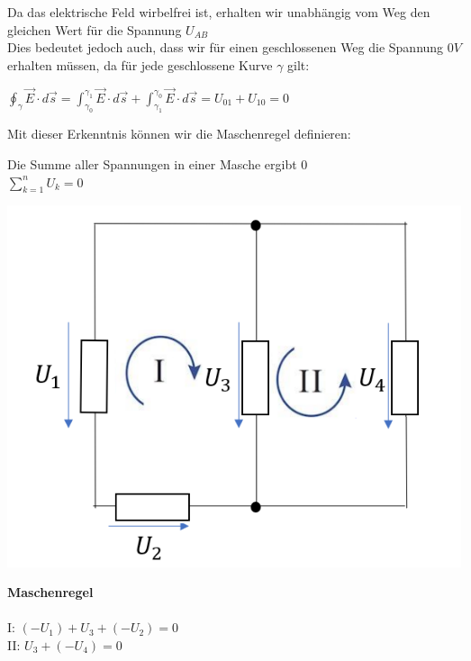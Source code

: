 										Da das elektrische Feld wirbelfrei ist, erhalten wir unabhängig vom Weg den gleichen Wert für die Spannung $ U_{AB} $ \\
										Dies bedeutet jedoch auch, dass wir für einen geschlossenen Weg die Spannung $0V$ erhalten müssen, da für jede geschlossene Kurve $\gamma$ gilt:
										\begin{center}
											\vspace{-2mm}

											$\displaystyle \oint_{\gamma} \vec{E} \cdot d\vec{s} = \int_{\gamma_0}^{\gamma_1} \vec{E} \cdot d\vec{s} + \int_{\gamma_1}^{\gamma_0} \vec{E} \cdot d\vec{s} = U_{01} + U_{10} = 0$
										\end{center}
										Mit dieser Erkenntnis können wir die Maschenregel definieren:

										\beginip
										Die Summe aller Spannungen in einer Masche ergibt $0$ \\
										\formulaBegin
										$\displaystyle \sum_{k=1}^n U_k = 0$
										\formulaEnd

										\iend

										\begin{minipage}{0.6\textwidth}
											\begin{flushright}
											\includegraphics[scale=0.45]{img/maschenregel-2.png}
										\end{flushright}
										\end{minipage}
										\begin{minipage}{0.4\textwidth}
											\textbf{Maschenregel} \\ \\
											I: $\displaystyle (- U_1) + U_3 + (-U_2)  = 0$ \\
											II: $\displaystyle U_3 + (- U_4) = 0 $ \\
										\end{minipage}

